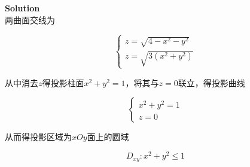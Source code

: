 \documentclass[12pt, a4paper]{article}
\numberwithin{equation}{section}
\begin{document}
    \textbf{Solution}
    \\

    两曲面交线为

    $$
        \left\{\begin{array}{l}
        z=\sqrt{4-x^2-y^2} \\
        z=\sqrt{3\left(x^2+y^2\right)}
        \end{array}\right.
    $$

    从中消去\(z\)得投影柱面\(x^2 + y^2 = 1\)，将其与\(z=0\)联立，得投影曲线

    $$
        \left\{\begin{array}{l}
        x^2+y^2=1 \\
        z=0
        \end{array}\right.
    $$

    从而得投影区域为\(xOy\)面上的圆域

    $$
    D_{xy}: x^2 + y^2 \leq 1
    $$
\end{document}
